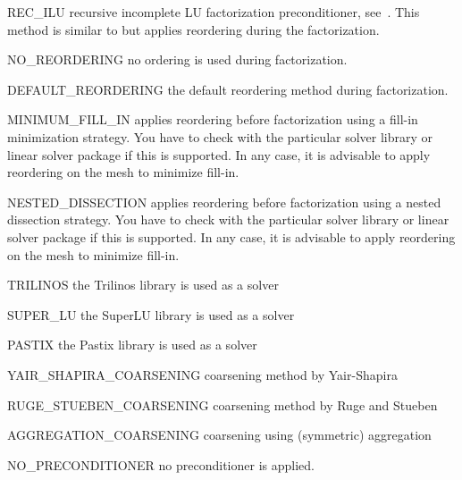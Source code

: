 \begin{memberdesc}[SolverOptions]{REC_ILU}
recursive incomplete LU factorization preconditioner, see~. This method is similar to  but applies reordering during the factorization.
\end{memberdesc}

\begin{memberdesc}[SolverOptions]{NO_REORDERING}
no ordering is used during factorization.
\end{memberdesc}

\begin{memberdesc}[SolverOptions]{DEFAULT_REORDERING}
the default reordering method during factorization.
\end{memberdesc}

\begin{memberdesc}[SolverOptions]{MINIMUM_FILL_IN}
applies reordering before factorization using a fill-in minimization strategy. You have to check with the particular solver library or
linear solver package if this is supported. In any case, it is advisable to apply reordering on the mesh to minimize fill-in.
\end{memberdesc}

\begin{memberdesc}[SolverOptions]{NESTED_DISSECTION}
applies reordering before factorization using a nested dissection strategy. You have to check with the particular solver library or
linear solver package if this is supported. In any case, it is advisable to apply reordering on the mesh to minimize fill-in.
\end{memberdesc}

\begin{memberdesc}[SolverOptions]{TRILINOS}
the Trilinos library is used as a solver~
\end{memberdesc}

\begin{memberdesc}[SolverOptions]{SUPER_LU}
the SuperLU library is used as a solver~
\end{memberdesc}

\begin{memberdesc}[SolverOptions]{PASTIX}
the Pastix library is used as a solver~
\end{memberdesc}


\begin{memberdesc}[SolverOptions]{YAIR_SHAPIRA_COARSENING}
\AMG coarsening method by Yair-Shapira
\end{memberdesc}

\begin{memberdesc}[SolverOptions]{RUGE_STUEBEN_COARSENING} \AMG coarsening method by Ruge and Stueben
\end{memberdesc}

\begin{memberdesc}[SolverOptions]{AGGREGATION_COARSENING} \AMG coarsening using (symmetric) aggregation 
\end{memberdesc}

\begin{memberdesc}[SolverOptions]{NO_PRECONDITIONER}
no preconditioner is applied.
\end{memberdesc}

